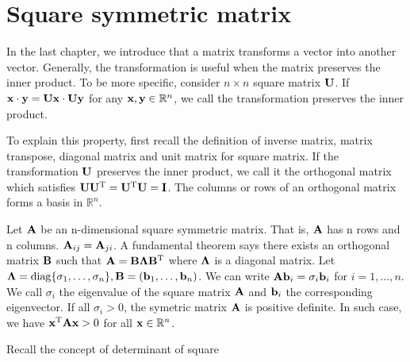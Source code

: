 \section{Square symmetric matrix}
In the last chapter, we introduce that a matrix transforms a vector into another vector. Generally, the transformation is useful when the matrix preserves the inner product. To be more specific, consider $ n \times n $ square matrix $\mathbf{U}$. If $ \mathbf{x} \cdot \mathbf{y} =  \mathbf{U}\mathbf{x} \cdot \mathbf{U}\mathbf{y}$ for any $\mathbf{x}, \mathbf{y} \in \mathbb{R}^n$, we call the transformation preserves the inner product.

To explain this property, first recall the definition of inverse matrix, matrix transpose, diagonal matrix and unit matrix for square matrix. If the transformation $\mathbf{U}$ preserves the inner product, 
we call it the orthogonal matrix which satisfies $\mathbf{U}\mathbf{U}^{\mathrm{T}} = \mathbf{U}^{\mathrm{T}}\mathbf{U}= \mathbf{I}$. The columns or rows of an orthogonal matrix forms a basis in $\mathbb{R}^n$.

Let $\mathbf{A}$ be an n-dimensional square symmetric matrix. That is, $\mathbf{A}$ has n rows and n columns. $\mathbf{A}_{ij} = \mathbf{A}_{ji}$. A fundamental theorem says there exists an orthogonal matrix $\mathbf{B}$ such that 
$\mathbf{A} = \mathbf{B} \mathbf{\Lambda} \mathbf{B}^{\mathrm{T}}$ where $\mathbf{\Lambda}$ is a diagonal matrix. Let $ \mathbf{\Lambda} = \operatorname{diag}\{ \sigma_1, \dots, \sigma_n \}, \mathbf{B} =  (\mathbf{b}_1, \dots, \mathbf{b}_n)$. We can write $\mathbf{A} \mathbf{b}_i = \sigma_i\mathbf{b}_i $ for $i=1, \dots, n $. We call $\sigma_i$ the eigenvalue of the square matrix $\mathbf{A}$ and $\mathbf{b}_i$ the corresponding eigenvector. If all $\sigma_i > 0$, the symetric matrix $\mathbf{A}$ is positive definite. In such case, we have $\mathbf{x}^{\mathrm{T}} \mathbf{A} \mathbf{x} > 0$ for all $\mathbf{x} \in \mathbb{R}^n$.

Recall the concept of determinant of square 


